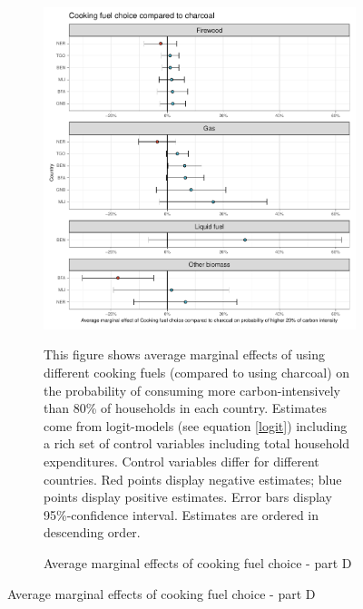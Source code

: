  \begin{figure}[ht!]\ContinuedFloat
   \centering
   \begin{subfigure}[b]{\textwidth}
   \centering
   \includegraphics{1_Figures/Analysis_Logit_Models_Marginal_Effects/Average_Marginal_Effects_affected_upper_80_CF_Charcoal_2017B.pdf}
   \caption{Average marginal effects of cooking fuel choice - part D} \label{fig:Logit_ME_CF_4}
   \begin{subcaption2}
     This figure shows average marginal effects of using different cooking fuels (compared to using charcoal) on the probability of consuming more carbon-intensively than 80\% of households in each country. Estimates come from logit-models (see equation \ref{logit}) including a rich set of control variables including total household expenditures. Control variables differ for different countries. Red points display negative estimates; blue points display positive estimates. Error bars display 95\%-confidence interval. Estimates are ordered in descending order.
   \end{subcaption2}
   \end{subfigure}
 \end{figure}
 \clearpage
